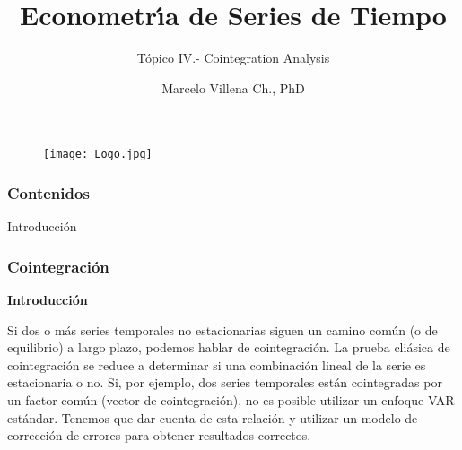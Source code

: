 \documentclass[spanish,xcolor=table]{beamer}
\title[ECO -TS101]{Econometr\'\i{}a de Series de Tiempo}
\subtitle{T\'opico IV.- Cointegration Analysis}
\author{Marcelo Villena Ch., PhD}
\institute[UAI] %
{
Universidad Adolfo Ib\'a\~nez 
 \\ %
\medskip
}
\date{} %
\begin{document}
\begin{frame}

\begin{figure}[t!]
\texttt{[image: Logo.jpg]}
\end{figure}
\titlepage %
\end{frame}

\begin{frame}
\frametitle{Contenidos} 
\tableofcontents %
\end{frame}



\begin{section}{Introducci\'on}
\begin{frame}
\frametitle{Cointegraci\'on}
\textbf{Introducci\'on}

Si dos o más series temporales no estacionarias siguen un camino común (o  de equilibrio) a largo plazo, podemos hablar de cointegraci\'on. La prueba cli\'asica de cointegraci\'on se reduce a determinar si una combinaci\'on lineal de la serie es estacionaria o no. Si, por ejemplo, dos series temporales est\'an cointegradas por un factor com\'un (vector de cointegraci\'on), no es posible utilizar un enfoque VAR est\'andar. Tenemos que dar cuenta de esta relaci\'on y utilizar un modelo de correcci\'on de errores para obtener resultados correctos.

\end{frame}
\end{section}
\end{document}
